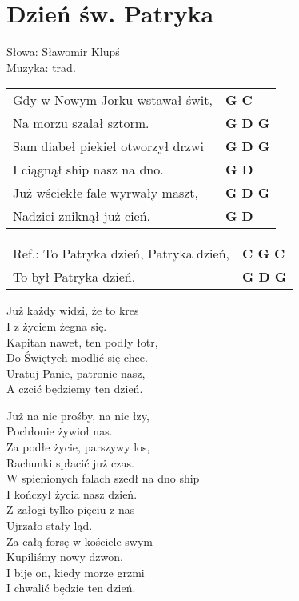 \section{Dzień św. Patryka}

Słowa: Sławomir Klupś \\
Muzyka:  trad.

\vspace{2em}
\begin{tabular}{@{}p{9cm}@{}l@{}}
Gdy w Nowym Jorku wstawał świt, & \bfseries G C \\
Na morzu szalał sztorm. & \bfseries G D G \\
Sam diabeł piekieł otworzył drzwi & \bfseries G D G \\
I ciągnął ship nasz na dno. & \bfseries G D \\
Już wściekłe fale wyrwały maszt, & \bfseries G D G \\
Nadziei zniknął już cień. & \bfseries G D \\
\end{tabular}

\vspace{1em}
\begin{tabular}{@{}p{9cm}@{}l@{}}
Ref.: To Patryka dzień, Patryka dzień, & \bfseries C G C \\
To był Patryka dzień. & \bfseries G D G \\
\end{tabular}

\vspace{1em}
Już każdy widzi, że to kres \\
I z życiem żegna się. \\
Kapitan nawet, ten podły łotr, \\
Do Świętych modlić się chce. \\
Uratuj Panie, patronie nasz, \\
A czcić będziemy ten dzień. \\
\begin{multicols}{2}
Już na nic prośby, na nic łzy, \\
Pochłonie żywioł nas. \\
Za podłe życie, parszywy los, \\
Rachunki spłacić już czas. \\
W spienionych falach szedł na dno ship \\
I kończył życia nasz dzień. \\

Z załogi tylko pięciu z nas \\
Ujrzało stały ląd. \\
Za całą forsę w kościele swym \\
Kupiliśmy nowy dzwon. \\
I bije on, kiedy morze grzmi \\
I chwalić będzie ten dzień.
\end{multicols}
